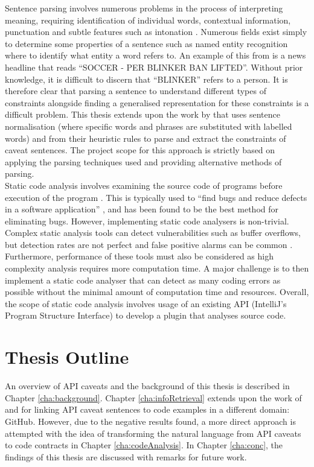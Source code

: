 Sentence parsing involves numerous problems in the process of interpreting meaning, requiring identification of individual words, contextual information, punctuation and subtle features such as intonation \cite{mitchell1994sentence}. Numerous fields exist simply to determine some properties of a sentence such as named entity recognition where to identify what entity a word refers to. An example of this from \cite{ratinov-roth-2009-design} is a news headline that reads ``SOCCER - PER BLINKER BAN LIFTED''. Without prior knowledge, it is difficult to discern that ``BLINKER'' refers to a person. It is therefore clear that parsing a sentence to understand different types of constraints alongside finding a generalised representation for these constraints is a difficult problem. This thesis extends upon the work by \cite{zhou-directive} that uses sentence normalisation (where specific words and phrases are substituted with labelled words) and from their heuristic rules to parse and extract the constraints of caveat sentences. The project scope for this approach is strictly based on applying the parsing techniques used and providing alternative methods of parsing. \\
Static code analysis involves examining the source code of programs before execution of the program \cite{baca2009static}. This is typically used to ``find bugs and reduce defects in a software application'' \cite{bardas2010static}, and has been found to be the best method for eliminating bugs. However, implementing static code analysers is non-trivial. Complex static analysis tools can detect vulnerabilities such as buffer overflows, but detection rates are not perfect and false positive alarms can be common \cite{zitser2004testing}. Furthermore, performance of these tools must also be considered as high complexity analysis requires more computation time. A major challenge is to then implement a static code analyser that can detect as many coding errors as possible without the minimal amount of computation time and resources. Overall, the scope of static code analysis involves usage of an existing API (IntelliJ's Program Structure Interface) to develop a plugin that analyses source code.

\section{Thesis Outline}
\label{sec:outline}
An overview of API caveats and the background of this thesis is described in Chapter \ref{cha:background}. Chapter \ref{cha:infoRetrieval} extends upon the work of \cite{jiamou} and \cite{xiaoxue} for linking API caveat sentences to code examples in a different domain: GitHub. However, due to the negative results found, a more direct approach is attempted with the idea of transforming the natural language from API caveats to code contracts in Chapter \ref{cha:codeAnalysis}. In Chapter \ref{cha:conc}, the findings of this thesis are discussed with remarks for future work.

